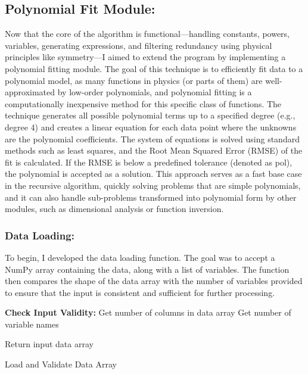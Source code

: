 \documentclass{article}
\begin{document}
\subsection{Polynomial Fit Module: }

Now that the core of the algorithm is functional—handling constants, powers, variables, generating expressions, and filtering redundancy using physical principles like symmetry—I aimed to extend the program by implementing a polynomial fitting module. The goal of this technique is to efficiently fit data to a polynomial model, as many functions in physics (or parts of them) are well-approximated by low-order polynomials, and polynomial fitting is a computationally inexpensive method for this specific class of functions. The technique generates all possible polynomial terms up to a specified degree (e.g., degree 4) and creates a linear equation for each data point where the unknowns are the polynomial coefficients. The system of equations is solved using standard methods such as least squares, and the Root Mean Squared Error (RMSE) of the fit is calculated. If the RMSE is below a predefined tolerance (denoted as pol), the polynomial is accepted as a solution. This approach serves as a fast base case in the recursive algorithm, quickly solving problems that are simple polynomials, and it can also handle sub-problems transformed into polynomial form by other modules, such as dimensional analysis or function inversion.\\


\subsubsection{Data Loading:}

To begin, I developed the data loading function. The goal was to accept a NumPy array containing the data, along with a list of variables. The function then compares the shape of the data array with the number of variables provided to ensure that the input is consistent and sufficient for further processing.\\



\begin{algorithm}[H]
\SetAlgoLined
{}

\textbf{Check Input Validity:}\;
Get number of columns in data array\;
Get number of variable names\;


Return input data array\;

\caption{Load and Validate Data Array}
\label{alg:load_data_array} %
\end{algorithm}
\end{document}
